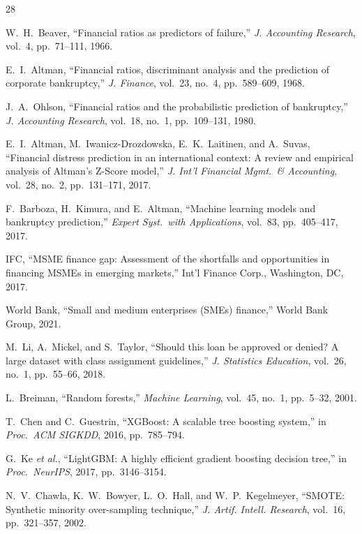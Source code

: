\documentclass[conference]{IEEEtran}
\begin{document}
\begin{thebibliography}{28}

 W.~H.~Beaver, ``Financial ratios as predictors of failure,'' \textit{J. Accounting Research}, vol.~4, pp.~71--111, 1966.

 E.~I.~Altman, ``Financial ratios, discriminant analysis and the prediction of corporate bankruptcy,'' \textit{J. Finance}, vol.~23, no.~4, pp.~589--609, 1968.

 J.~A.~Ohlson, ``Financial ratios and the probabilistic prediction of bankruptcy,'' \textit{J. Accounting Research}, vol.~18, no.~1, pp.~109--131, 1980.

 E.~I.~Altman, M.~Iwanicz-Drozdowska, E.~K.~Laitinen, and A.~Suvas, ``Financial distress prediction in an international context: A review and empirical analysis of Altman's Z-Score model,'' \textit{J. Int'l Financial Mgmt.\ \& Accounting}, vol.~28, no.~2, pp.~131--171, 2017.

 F.~Barboza, H.~Kimura, and E.~Altman, ``Machine learning models and bankruptcy prediction,'' \textit{Expert Syst.\ with Applications}, vol.~83, pp.~405--417, 2017.

 IFC, ``MSME finance gap: Assessment of the shortfalls and opportunities in financing MSMEs in emerging markets,'' Int'l Finance Corp., Washington, DC, 2017.

 World Bank, ``Small and medium enterprises (SMEs) finance,'' World Bank Group, 2021.

 M.~Li, A.~Mickel, and S.~Taylor, ``Should this loan be approved or denied? A large dataset with class assignment guidelines,'' \textit{J. Statistics Education}, vol.~26, no.~1, pp.~55--66, 2018.

 L.~Breiman, ``Random forests,'' \textit{Machine Learning}, vol.~45, no.~1, pp.~5--32, 2001.

 T.~Chen and C.~Guestrin, ``XGBoost: A scalable tree boosting system,'' in \textit{Proc.\ ACM SIGKDD}, 2016, pp.~785--794.

 G.~Ke \textit{et al.}, ``LightGBM: A highly efficient gradient boosting decision tree,'' in \textit{Proc.\ NeurIPS}, 2017, pp.~3146--3154.

 N.~V.~Chawla, K.~W.~Bowyer, L.~O.~Hall, and W.~P.~Kegelmeyer, ``SMOTE: Synthetic minority over-sampling technique,'' \textit{J. Artif. Intell. Research}, vol.~16, pp.~321--357, 2002.


\end{thebibliography}
\end{document}
